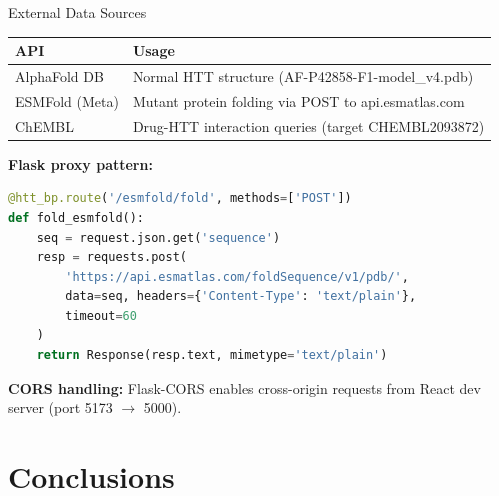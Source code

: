 \documentclass[aspectratio=169,11pt]{beamer}
\begin{document}
\begin{frame}[fragile]{External Data Sources}
    \begin{tabular}{p{3cm}|p{8cm}}
        \toprule
        \textbf{API} & \textbf{Usage} \\
        \midrule
        AlphaFold DB   & Normal HTT structure (AF-P42858-F1-model\_v4.pdb) \\
        ESMFold (Meta) & Mutant protein folding via POST to api.esmatlas.com \\
        ChEMBL         & Drug-HTT interaction queries (target CHEMBL2093872) \\
        \bottomrule
    \end{tabular}

    \vspace{0.5cm}
    \textbf{Flask proxy pattern:}
    \begin{lstlisting}[language=Python, basicstyle=\ttfamily\scriptsize]
@htt_bp.route('/esmfold/fold', methods=['POST'])
def fold_esmfold():
    seq = request.json.get('sequence')
    resp = requests.post(
        'https://api.esmatlas.com/foldSequence/v1/pdb/',
        data=seq, headers={'Content-Type': 'text/plain'},
        timeout=60
    )
    return Response(resp.text, mimetype='text/plain')
    \end{lstlisting}

    \textbf{CORS handling:} Flask-CORS enables cross-origin requests from React dev server (port 5173 $\to$ 5000).
\end{frame}

\section{Conclusions}
\end{document}
